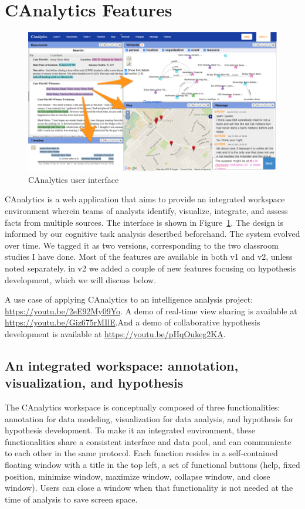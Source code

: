 \section{CAnalytics Features}\label{canalytics-features}

\begin{figure}
\centering
\includegraphics[width=\columnwidth]{03-System/img/interface.png}
\caption{CAnalytics user interface \label{fig:interface}}
\end{figure}

CAnalytics is a web application that aims to provide an integrated workspace
environment wherein teams of analysts identify, visualize, integrate, and assess
facts from multiple sources. The interface is shown in Figure~\ref{fig:interface}. The design is
informed by our cognitive task analysis described beforehand. The system evolved over time. We tagged it as two versions, corresponding to the two classroom studies I have done. Most of the features are available in both v1 and v2, unless noted separately. in v2 we added a couple of new features focusing on hypothesis development, which we will discuss below. 

A use case of applying CAnalytics to an intelligence analysis project: \url{https://youtu.be/2eE92My09Yo}.
A demo of real-time view sharing is available at \url{https://youtu.be/Giz675rMIlE}.And a demo of collaborative hypothesis development is available at \url{https://youtu.be/pHqOukeg2KA}.


\subsection{An integrated workspace: annotation, visualization, and hypothesis}

The CAnalytics workspace is conceptually composed of three functionalities:
annotation for data modeling, visualization for data analysis, and hypothesis
for hypothesis development. To make it an integrated environment, these functionalities share a
consistent interface and data pool, and can communicate to each other in the
same protocol. Each function resides in a self-contained floating window with a title in the top left, a set of functional buttons (help, fixed position, minimize window, maximize window, collapse window, and close window). Users can close a window when that functionality is not needed at the time of analysis to save screen space.

